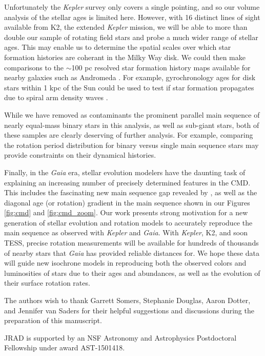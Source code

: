 \documentclass[preprint2]{aastex62}
\newcommand{\Kepler}{\textsl{Kepler}\xspace}
\begin{document}
Unfortunately the \Kepler survey only covers a single pointing, and so our volume analysis of the stellar ages is limited here. However, with 16 distinct lines of sight available from K2, the extended \Kepler mission, we will be able to more than double our sample of rotating field stars and probe a much wider range of stellar ages. This may enable us to determine the spatial scales over which star formation histories are coherant in the Milky Way disk. We could then make comparisons to the $\sim$100 pc resolved star formation history maps available for nearby galaxies such as Andromeda \citep[][]{lewis2015,williams2017}. For example, gyrochronology ages for disk stars within 1 kpc of the Sun could be used to test if star formation propagates due to spiral arm density waves \citep[e.g. see][]{choi2015}.


While we have removed as contaminants the prominent parallel main sequence of nearly equal-mass binary stars in this analysis, as well as sub-giant stars, both of these samples are clearly deserving of further analysis. For example, comparing the rotation period distribution for binary versus single main sequence stars may provide constraints on their dynamical histories. 

Finally, in the {\em Gaia} era, stellar evolution modelers have the daunting task of explaining an increasing number of precisely determined features in the CMD.
This includes the fascinating new main sequence gap revealed by \citet{jao2018}, as well as the diagonal age (or rotation) gradient in the main sequence shown in our Figures \ref{fig:cmd} and \ref{fig:cmd_zoom}.
Our work presents strong motivation for a new generation of stellar evolution and rotation models to accurately reproduce the main sequence as observed with \Kepler and {\em Gaia}. With \Kepler, K2, and soon TESS, precise rotation measurements will be available for hundreds of thousands of nearby stars that {\em Gaia} has provided reliable distances for. We hope these data will guide new isochrone models in reproducing both the observed colors and luminosities of stars due to their ages and abundances, as well as the evolution of their surface rotation rates. 


\acknowledgments
The authors wish to thank Garrett Somers, Stephanie Douglas, Aaron Dotter, and Jennifer van Saders for their helpful suggestions and discussions during the preparation of this manuscript.

JRAD is supported by an NSF Astronomy and Astrophysics Postdoctoral Fellowship under award AST-1501418. 
\end{document}
